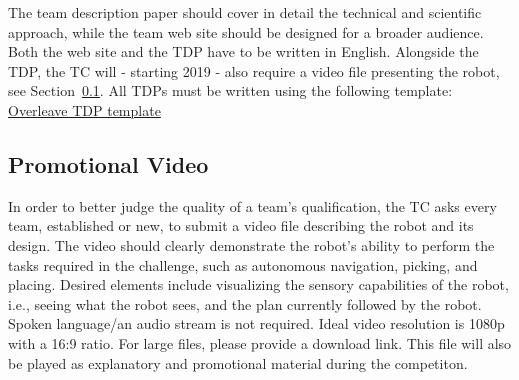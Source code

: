 The team description paper should cover in detail the technical and scientific approach, while the team web site should be designed for a broader audience. Both the web site and the TDP have to be written in English. Alongside the TDP, the TC will - starting 2019 - also require a video file presenting the robot, see Section~\ref{ssec:promotional_video}. All TDPs must be written using the following template: \href{https://www.overleaf.com/latex/templates/springer-lecture-notes-in-computer-science/kzwwpvhwnvfj#.WtR5Hy5ua71}{Overleave TDP template} 

\subsection{Promotional Video}
\label{ssec:promotional_video}
In order to better judge the quality of a team's qualification, the TC asks every team, established or new, to submit a video file describing the robot and its design. The video should clearly demonstrate the robot's ability to perform the tasks required in the challenge, such as autonomous navigation, picking, and placing. Desired elements include visualizing the sensory capabilities of the robot, i.e., seeing what the robot sees, and the plan currently followed by the robot. Spoken language/an audio stream is not required. Ideal video resolution is 1080p with a 16:9 ratio. For large files, please provide a download link.
This file will also be played as explanatory and promotional material during the competiton.
